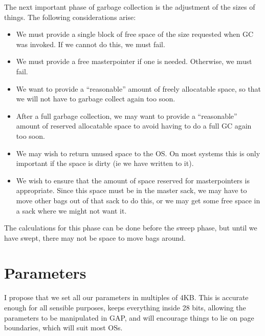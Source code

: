 \documentclass[12pt]{article}
\newcommand{\GAP}{\textsf{GAP}}
\begin{document}
The next important phase of garbage collection is the adjustment of
the sizes of things. The following considerations arise:

\begin{itemize}
\item We must provide a single block of free space of the size
requested when GC was invoked. If we cannot do this, we must fail.
\item We must provide a free masterpointer if one is
needed. Otherwise, we must fail.
\item We want to provide a ``reasonable'' amount of freely allocatable space, 
so that we will not have to garbage collect again too soon.
\item After a full garbage collection, we may want to provide a
``reasonable'' amount of reserved allocatable space  to avoid having
to do a full GC again too soon.
\item We may wish to return unused space to the OS. On most systems
this is only important if the space is dirty (ie we have written to
it).
\item We wish to ensure that the amount of space reserved for
masterpointers is appropriate. Since this space must be in the master
sack, we may have to move other bags out of that sack to do this, or
we may get some free space in a sack where we might not want it.
\end{itemize}

The calculations for this phase can be done before the sweep phase,
but until we have swept, there may not be space to move bags around.

\section{Parameters}

I propose that we set all our parameters in multiples of 4KB. This is
accurate enough for all sensible purposes, keeps everything inside 28
bits, allowing the parameters to be manipulated in \GAP, and will
encourage things to lie on page boundaries, which will suit most OSs.
\end{document}

